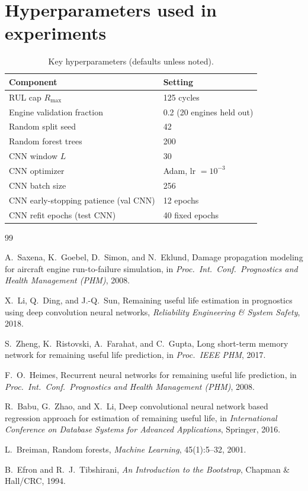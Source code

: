 \documentclass[11pt]{article}
\begin{document}
\section{Hyperparameters used in experiments}
\begin{table}[ht]
  \centering
  \caption{Key hyperparameters (defaults unless noted).}
  \label{tab:hyp}
  \begin{tabular}{ll}
    \toprule
    Component & Setting \\
    \midrule
    RUL cap $R_{\max}$ & 125 cycles \\
    Engine validation fraction & 0.2 (20 engines held out) \\
    Random split seed & 42 \\
    Random forest trees & 200 \\
    CNN window $L$ & 30 \\
    CNN optimizer & Adam, lr $=10^{-3}$ \\
    CNN batch size & 256 \\
    CNN early-stopping patience (val CNN) & 12 epochs \\
    CNN refit epochs (test CNN) & 40 fixed epochs \\
    \bottomrule
  \end{tabular}
\end{table}

\begin{thebibliography}{99}

A.~Saxena, K.~Goebel, D.~Simon, and N.~Eklund,
\newblock Damage propagation modeling for aircraft engine run-to-failure simulation,
\newblock in \emph{Proc.\ Int.\ Conf.\ Prognostics and Health Management (PHM)}, 2008.

X.~Li, Q.~Ding, and J.-Q.~Sun,
\newblock Remaining useful life estimation in prognostics using deep convolution neural networks,
\newblock \emph{Reliability Engineering \& System Safety}, 2018.

S.~Zheng, K.~Ristovski, A.~Farahat, and C.~Gupta,
\newblock Long short-term memory network for remaining useful life prediction,
\newblock in \emph{Proc.\ IEEE PHM}, 2017.

F.~O.~Heimes,
\newblock Recurrent neural networks for remaining useful life prediction,
\newblock in \emph{Proc.\ Int.\ Conf.\ Prognostics and Health Management (PHM)}, 2008.

R.~Babu, G.~Zhao, and X.~Li,
\newblock Deep convolutional neural network based regression approach for estimation of remaining useful life,
\newblock in \emph{International Conference on Database Systems for Advanced Applications}, Springer, 2016.

L.~Breiman,
\newblock Random forests,
\newblock \emph{Machine Learning}, 45(1):5--32, 2001.

B.~Efron and R.~J.~Tibshirani,
\newblock \emph{An Introduction to the Bootstrap},
\newblock Chapman \& Hall/CRC, 1994.

\end{thebibliography}
\end{document}
